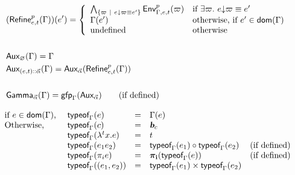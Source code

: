 \documentclass[a4paper]{article}
\theoremstyle{definition}
\begin{document}
    \begin{align*}
      &(\textsf{Refine}^{p}_{e,t}(\Gamma))(e') = 
        \left\{\begin{array}{ll}
          \bigwedge_{\{\varpi ~|~ e{\downarrow}\varpi \equiv e'\}} \textsf{Env}^{p}_{\Gamma,e,t} (\varpi) & \text{if } \exists \varpi.\ e{\downarrow}\varpi \equiv e' \\
          \Gamma(e') & \text{otherwise, if } e' \in \textsf{dom}(\Gamma)\\
          \text{undefined} & \text{otherwise}
        \end{array}\right.\\&\\
      &\textsf{Aux}_{\varnothing}(\Gamma) = \Gamma\\
      &\textsf{Aux}_{{(e,t)}\textsf{::}{\vec \alpha}}(\Gamma) = \textsf{Aux}_{\vec \alpha}(\textsf{Refine}^{p}_{e,t}(\Gamma))\\&\\
      &\textsf{Gamma}_{\vec \alpha}(\Gamma)=\textsf{gfp}_\Gamma (\textsf{Aux}_{\vec \alpha})\qquad \text{(if defined)}
    \end{align*}

    \begin{align*}
      \begin{array}{llclr}
        \text{if } e \in \dom \Gamma \text{, } & \tyof e \Gamma &=& \Gamma(e)\\
      \text{Otherwise,} & \tyof c \Gamma &=& \basic{c}\\
      &\tyof {\lambda^{t}x.e} \Gamma &=& t\\
      &\tyof {{e_1} {e_2}} \Gamma &=& \apply {\tyof {e_1} \Gamma} {\tyof {e_2} \Gamma} & \text{(if defined)}\\
      &\tyof {\pi_i e} \Gamma &=& \bpi_{\mathbf{i}}(\tyof e \Gamma) & \text{(if defined)}\\
      &\tyof {(e_1,e_2)} \Gamma &=& \pair{\tyof {e_1} \Gamma}{\tyof {e_2} \Gamma}
      \end{array}
    \end{align*}
\end{document}
